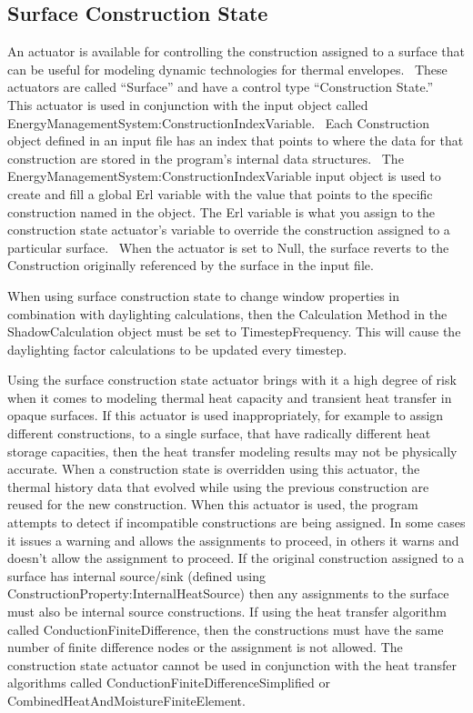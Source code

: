 \subsection{Surface Construction State}\label{surface-construction-state}

An actuator is available for controlling the construction assigned to a surface that can be useful for modeling dynamic technologies for thermal envelopes.~ These actuators are called ``Surface'' and have a control type ``Construction State.''~ This actuator is used in conjunction with the input object called EnergyManagementSystem:ConstructionIndexVariable.~ Each Construction object defined in an input file has an index that points to where the data for that construction are stored in the program's internal data structures.~ The EnergyManagementSystem:ConstructionIndexVariable input object is used to create and fill a global Erl variable with the value that points to the specific construction named in the object. The Erl variable is what you assign to the construction state actuator's variable to override the construction assigned to a particular surface.~ When the actuator is set to Null, the surface reverts to the Construction originally referenced by the surface in the input file.

When using surface construction state to change window properties in combination with daylighting calculations, then the Calculation Method in the ShadowCalculation object must be set to TimestepFrequency. This will cause the daylighting factor calculations to be updated every timestep.

Using the surface construction state actuator brings with it a high degree of
risk when it comes to modeling thermal heat capacity and transient heat
transfer in opaque surfaces. If this actuator is used inappropriately, for
example to assign different constructions, to a single surface, that have
radically different heat storage capacities, then the heat transfer modeling
results may not be physically accurate. When a construction state is overridden
using this actuator, the thermal history data that evolved while using the
previous construction are reused for the new construction. When this actuator
is used, the program attempts to detect if incompatible constructions are being
assigned. In some cases it issues a warning and allows the assignments to
proceed, in others it warns and doesn't allow the assignment to proceed. If the
original construction assigned to a surface has internal source/sink (defined
using ConstructionProperty:InternalHeatSource) then any assignments to the
surface must also be internal source constructions. If using the heat transfer
algorithm called ConductionFiniteDifference, then the constructions must have
the same number of finite difference nodes or the assignment is not allowed.
The construction state actuator cannot be used in conjunction with the heat
transfer algorithms called ConductionFiniteDifferenceSimplified or
CombinedHeatAndMoistureFiniteElement.

